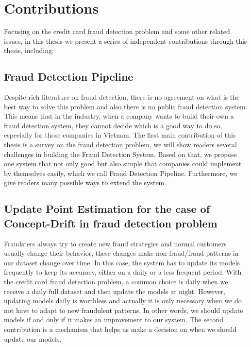 \section{Contributions}

Focusing on the credit card fraud detection problem and some other related issues, in this thesis we present a series of independent contributions through this thesis, including:


\subsection*{Fraud Detection Pipeline}

Despite rich literature on fraud detection, there is no agreement on what is the best way to solve this problem and also there is no public fraud detection system. This means that in the industry, when a company wants to build their own a fraud detection system, they cannot decide which is a good way to do so, especially for those companies in Vietnam. The first main contribution of this thesis is a survey on the fraud detection problem, we will show readers several challenges in building the Fraud Detection System. Based on that, we propose one system that not only good but also simple that companies could implement by themselves easily, which we call Fraud Detection Pipeline. Furthermore, we give readers many possible ways to extend the system.


\subsection*{Update Point Estimation for the case of Concept-Drift in fraud detection problem}

Fraudsters always try to create new fraud strategies and normal customers usually change their behavior, these changes make non-fraud/fraud patterns in our dataset change over time. In this case, the system has to update its models frequently to keep its accuracy, either on a daily or a less frequent period. With the credit card fraud detection problem, a common choice is daily when we receive a daily full dataset and then update the models at night. However, updating models daily is worthless and actually it is only necessary when we do not have to adapt to new fraudulent patterns. In other words, we should update models if and only if it makes an improvement to our system. The second contribution is a mechanism that helps us make a decision on when we should update our models.


